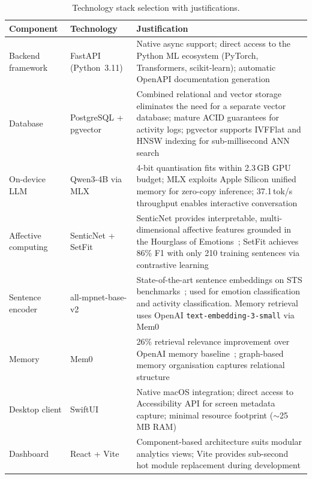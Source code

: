 \begin{table}[htbp]
  \centering
  \caption{Technology stack selection with justifications.}
  \label{tab:tech_stack}
  \begin{tabular}{p{2.8cm}|p{3.8cm}p{7cm}}
    \toprule
    \textbf{Component} & \textbf{Technology} & \textbf{Justification} \\
    \midrule
    Backend framework & FastAPI (Python~3.11) & Native async support; direct access to the Python ML ecosystem (PyTorch, Transformers, scikit-learn); automatic OpenAPI documentation generation \\
    \addlinespace
    Database & PostgreSQL + pgvector & Combined relational and vector storage eliminates the need for a separate vector database; mature ACID guarantees for activity logs; pgvector supports IVFFlat and HNSW indexing for sub-millisecond ANN search \\
    \addlinespace
    On-device LLM & Qwen3-4B via MLX & 4-bit quantisation fits within 2.3\,GB GPU budget; MLX exploits Apple Silicon unified memory for zero-copy inference; 37.1\,tok/s throughput enables interactive conversation \\
    \addlinespace
    Affective computing & SenticNet + SetFit & SenticNet provides interpretable, multi-dimensional affective features grounded in the Hourglass of Emotions~\cite{cambria2016}; SetFit achieves 86\% F1 with only 210 training sentences via contrastive learning \\
    \addlinespace
    Sentence encoder & all-mpnet-base-v2 & State-of-the-art sentence embeddings on STS benchmarks~\cite{reimers2019}; used for emotion classification and activity classification. Memory retrieval uses OpenAI \texttt{text-embedding-3-small} via Mem0 \\
    \addlinespace
    Memory & Mem0 & 26\% retrieval relevance improvement over OpenAI memory baseline~\cite{chhikara2025}; graph-based memory organisation captures relational structure \\
    \addlinespace
    Desktop client & SwiftUI & Native macOS integration; direct access to Accessibility API for screen metadata capture; minimal resource footprint ($\sim$25\,MB RAM) \\
    \addlinespace
    Dashboard & React + Vite & Component-based architecture suits modular analytics views; Vite provides sub-second hot module replacement during development \\
    \bottomrule
  \end{tabular}
\end{table}

